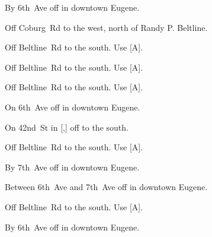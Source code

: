 

\begin{LocationList}

By 6th~Ave off  in downtown Eugene.

Off Coburg~Rd to the west, north of  Randy P. Beltline.

Off Beltline~Rd to the south.
Use  [A].

\Location{\GasStation \Gas}
Off Beltline~Rd to the south.
Use  [A].

\Location{\GarageHQ \Garage}
Off Beltline~Rd to the south.
Use  [A].

On 6th~Ave off  in downtown Eugene.

On 42nd~St in [,] off   to the south.

\Location{\RecruitmentAgency \Recruitment}
Off Beltline~Rd to the south.
Use  [A].

By  7th~Ave off  in downtown Eugene.

Between 6th~Ave and  7th~Ave off  in downtown Eugene.

Off Beltline~Rd to the south.
Use  [A].

By 6th~Ave off  in downtown Eugene.

\end{LocationList}
